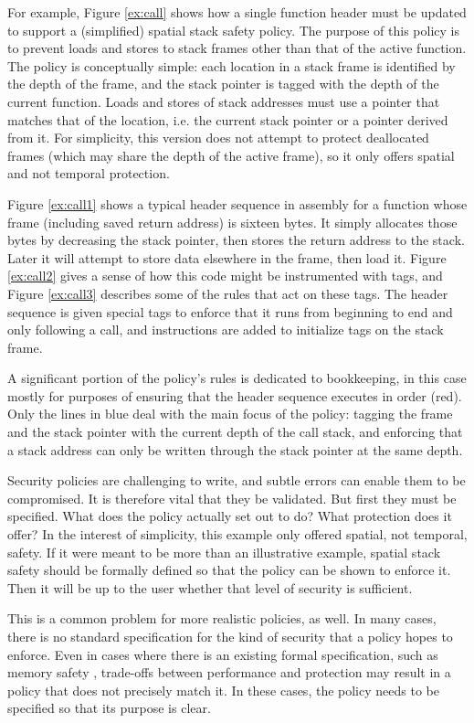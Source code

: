 \documentclass{report}
\begin{document}
For example, Figure \ref{ex:call} shows how a single function header must be updated to
support a (simplified) spatial stack safety policy. The purpose of this policy is to prevent
loads and stores to stack frames other than that of the active function.
The policy is conceptually simple:
each location in a stack frame is identified by the depth of the frame, and the stack pointer
is tagged with the depth of the current function.  Loads and stores of stack
addresses must use a pointer that matches that of the location, i.e. the current stack pointer
or a pointer derived from it. For simplicity, this version does not attempt to protect deallocated
frames (which may share the depth of the active frame), so it only offers spatial and not temporal
protection.

Figure \ref{ex:call1} shows a typical header sequence in assembly for a function whose frame
(including saved return address) is sixteen bytes. It simply allocates those bytes by decreasing
the stack pointer, then stores the return address to the stack. Later it will attempt to store data
elsewhere in the frame, then load it. Figure \ref{ex:call2} gives a sense of how
this code might be instrumented with tags, and Figure \ref{ex:call3} describes some of
the rules that act on these tags. The header sequence is given special tags to enforce
that it runs from beginning to end and only following a call, and instructions are added
to initialize tags on the stack frame.

A significant portion of the policy's rules is dedicated to bookkeeping, in this case
mostly for purposes of ensuring that the header sequence executes in order (red).
Only the lines in blue deal with the main focus of the policy:
tagging the frame and the stack pointer with the current depth of the call stack, and enforcing
that a stack address can only be written through the stack pointer at the same depth.

Security policies are challenging to write, and subtle errors can enable them to be compromised.
It is therefore vital that they be validated. But first they must be specified. What does the
policy actually set out to do? What protection does it offer? In the interest of simplicity,
this example only offered spatial, not temporal, safety. If it were meant to be more than
an illustrative example, spatial stack safety should be formally defined so that the policy can be
shown to enforce it. Then it will be up to the user whether that level of security is sufficient.

This is a common problem for more realistic policies, as well.
In many cases, there is no standard specification for the kind of security that a policy hopes
to enforce. Even in cases where there is an existing formal specification, such as
memory safety \cite{Azevedo+16}, trade-offs between performance and protection may result in a
policy that does not precisely match it. In these cases, the policy needs to be specified so
that its purpose is clear.
\end{document}
